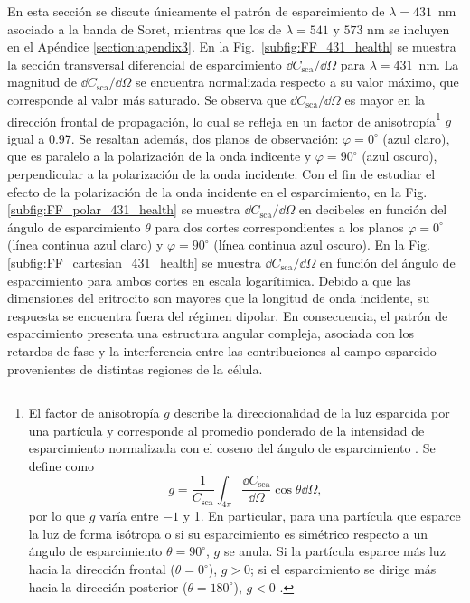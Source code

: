 En esta sección se discute únicamente el patrón de esparcimiento de $\lambda=431$~nm asociado a la banda de Soret, mientras que los de $\lambda=541$ y $573$ nm se incluyen en el Apéndice \ref{section:apendix3}. En la Fig.~\ref{subfig:FF_431_health} se muestra la sección transversal diferencial de esparcimiento $\dd{C_{\text{sca}}}/\dd{\Omega}$ para $\lambda=431$~nm. La magnitud de $\dd{C_{\text{sca}}}/\dd{\Omega}$ se encuentra normalizada respecto a su valor máximo, que corresponde al valor más saturado. Se observa que $\dd{C_{\text{sca}}}/\dd{\Omega}$ es mayor en la dirección frontal de propagación, lo cual se refleja en un factor de anisotropía\footnote{%
	El factor de anisotropía $g$ describe la direccionalidad de la luz esparcida por una partícula y corresponde al promedio ponderado de la intensidad de esparcimiento normalizada con el coseno del ángulo de esparcimiento \cite{videenAsymmetryParameterAggregate1998}. Se define como \cite{bohrenAbsorptionScatteringLight2008}
	$$g=\dfrac{1}{C_{\text{sca}}}\int_{4 \pi}\dfrac{\dd{C_{\text{sca}}}}{\dd{\Omega}}\cos\theta\dd{\Omega},$$
	por lo que $g$ varía entre $-1$ y 1. En particular, para una partícula que esparce la luz de forma isótropa o si su esparcimiento es simétrico respecto a un ángulo de esparcimiento $\theta=90^{\circ}$, $g$ se anula. Si la partícula esparce más luz hacia la dirección frontal ($\theta=0^{\circ}$), $g>0$; si el esparcimiento se dirige más hacia la dirección posterior ($\theta=180^{\circ}$), $g<0$ \cite{bohrenAbsorptionScatteringLight2008}.} %
$g$ igual a 0.97. Se resaltan además, dos planos de observación: $\varphi=0^{\circ}$ (azul claro), que es paralelo a la polarización de la onda indicente y $\varphi=90^{\circ}$ (azul oscuro), perpendicular a la polarización de la onda incidente. Con el fin de estudiar el efecto de la polarización de la onda incidente en el esparcimiento, en la Fig. \ref{subfig:FF_polar_431_health} se muestra $\dd{C_{\text{sca}}}/\dd{\Omega}$ en decibeles en función del ángulo de esparcimiento $\theta$ para dos cortes correspondientes a los planos $\varphi=0^{\circ}$ (línea continua azul claro) y $\varphi=90^{\circ}$ (línea continua azul oscuro). En la Fig. \ref{subfig:FF_cartesian_431_health} se muestra $\dd{C_{\text{sca}}}/\dd{\Omega}$ en función del ángulo de esparcimiento para ambos cortes en escala logarítimica. Debido a que las dimensiones del eritrocito son mayores que la longitud de onda incidente, su respuesta se encuentra fuera del régimen dipolar. En consecuencia, el patrón de esparcimiento presenta una estructura angular compleja, asociada con los retardos de fase y la interferencia entre las contribuciones al campo esparcido provenientes de distintas regiones de la célula.
